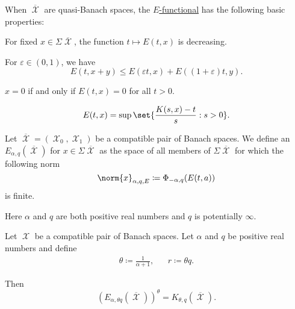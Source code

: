 \begin{proposition}\label{thm:e_functional_properties}\mcite\cite[lemma 7.1.3]{Bergh1976}
  When \( \overline{\mscrX} \) are quasi-Banach spaces, the \hyperref[def:e_functional]{\( E \)-functional} has the following basic properties:

  \begin{propenum}
     For fixed \( x \in \Sigma\overline{\mscrX} \), the function \( t \mapsto E(t, x) \) is decreasing.

     For \( \varepsilon \in (0, 1) \), we have
    \begin{equation*}
      E(t, x + y) \leq E(\varepsilon t, x) + E((1 + \varepsilon) t, y).
    \end{equation*}

     \( x = 0 \) if and only if \( E(t, x) = 0 \) for all \( t > 0 \).

    \mcite\cite[thm. 7.1.4]{Bergh1976}
    \begin{equation*}
      E(t, x) = \sup \set{ \frac {K(s, x) - t} s : s > 0 }.
    \end{equation*}
  \end{propenum}
\end{proposition}

\begin{definition}\label{def:approximation_space}\mcite\cite[def. 7.1.5]{Bergh1976}
  Let \( \overline{\mscrX} = (\mscrX_0, \mscrX_1) \) be a compatible pair of Banach spaces. We define an  \( E_{\alpha,q}(\overline{\mscrX}) \) for \( x \in \Sigma\overline{\mscrX} \) as the space of all members of \( \Sigma\overline{\mscrX} \) for which the following norm
  \begin{equation}\label{eq:def:approximation_space/norm}
    \norm{x}_{\alpha,q,E} \coloneqq \Phi_{-\alpha,q}(E(t,a))
  \end{equation}
  is finite.

  Here \( \alpha \) and \( q \) are both positive real numbers and \( q \) is potentially \( \infty \).
\end{definition}

\begin{theorem}\label{thm:interpolation_space_and_approximation_space}\mcite\cite[thm. 7.1.6]{Bergh1976}
  Let \( \mscrX \) be a compatible pair of Banach spaces. Let \( \alpha \) and \( q \) be positive real numbers and define
  \begin{align*}
    \theta \coloneqq \frac 1 {\alpha + 1},
    &&
    r \coloneqq \theta q.
  \end{align*}

  Then
  \begin{equation*}
    (E_{\alpha,\theta q}(\overline{\mscrX}))^\theta = K_{\theta,q}(\overline{\mscrX}).
  \end{equation*}
\end{theorem}

